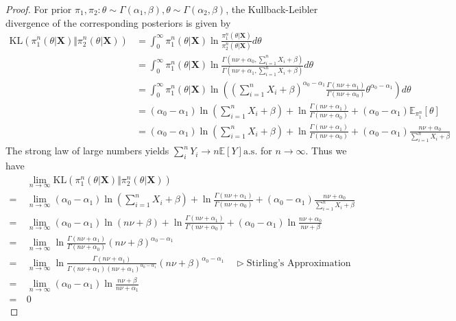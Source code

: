 \begin{proof}
For prior $\pi_1, \pi_2: \theta \sim \Gamma(\alpha_1, \beta), \theta \sim \Gamma(\alpha_2, \beta)$, the Kullback-Leibler divergence of the corresponding posteriors is given by
\begin{align*}
    \mathrm{KL}\left( \pi_1^{n}(\theta \vert \bm{X}) \Vert \pi_2^{n}(\theta \vert \bm{X})\right)
    &= \int_{0}^{\infty} \pi_1^{n}(\theta \vert \bm{X}) \ln \frac{\pi_1^{n}(\theta \vert \bm{X})}{\pi_2^{n}(\theta \vert \bm{X})} d\theta \\
    &= \int_{0}^{\infty} \pi_1^{n}(\theta \vert \bm{X}) \ln \frac
        {\Gamma(n\nu+\alpha_0, \sum_{i=1}^{n} X_i + \beta)}
        {\Gamma(n\nu+\alpha_1, \sum_{i=1}^{n} X_i + \beta)} d\theta \\
    &=\int_{0}^{\infty} \pi_1^{n}(\theta \vert \bm{X}) \ln \left(
        (\sum_{i=1}^{n}X_i + \beta)^{\alpha_0 - \alpha_1}
        \frac{\Gamma(n\nu+\alpha_1)}{\Gamma(n\nu+\alpha_0)}
        \theta^{\alpha_0 - \alpha_1}
        \right) d\theta\\
    &= (\alpha_0 - \alpha_1)\ln (\sum_{i=1}^{n}X_i + \beta) +
        \ln \frac{\Gamma(n\nu+\alpha_1)}{\Gamma(n\nu+\alpha_0)} +
        (\alpha_0 - \alpha_1) \mathbb{E}_{\pi^n_1} [\theta]\\
    &= (\alpha_0 - \alpha_1)\ln (\sum_{i=1}^{n}X_i + \beta) +
        \ln \frac{\Gamma(n\nu+\alpha_1)}{\Gamma(n\nu+\alpha_0)} +
        (\alpha_0 - \alpha_1) \frac{n\nu + \alpha_0}{\sum_{i=1}^{n}X_i + \beta}
\end{align*}
The strong law of large numbers yields $\sum_{i}^{n}Y_i \rightarrow n\mathbb{E} [Y] \mathrm{a.s.}$ for $n\rightarrow \infty$. Thus we have
\begin{align*}
    &\lim_{n\rightarrow\infty} \mathrm{KL}\left( \pi_1^{n}(\theta \vert \bm{X}) \Vert \pi_2^{n}(\theta \vert \bm{X})\right)\\
=\ & \lim_{n\rightarrow\infty} (\alpha_0 - \alpha_1)\ln (\sum_{i=1}^{n}X_i + \beta) +
        \ln \frac{\Gamma(n\nu+\alpha_1)}{\Gamma(n\nu+\alpha_0)} +
        (\alpha_0 - \alpha_1) \frac{n\nu + \alpha_0}{\sum_{i=1}^{n}X_i + \beta}\\
=\ & \lim_{n\rightarrow\infty} (\alpha_0 - \alpha_1) \ln(n\nu + \beta) + 
    \ln \frac{\Gamma(n\nu+\alpha_1)}{\Gamma(n\nu+\alpha_0)} + (\alpha_0 - \alpha_1) \ln \frac{n\nu+\alpha_0}{n\nu+\beta}\\
=\ & \lim_{n\rightarrow\infty} \ln \frac{\Gamma(n\nu+\alpha_1)}{\Gamma(n\nu+\alpha_0)} (n\nu + \beta)^{\alpha_0 - \alpha_1}\\
=\ & \lim_{n\rightarrow\infty} \ln \frac{\Gamma(n\nu+\alpha_1)}{\Gamma(n\nu+\alpha_1)(n\nu+\alpha_1)^{\alpha_0 - \alpha_1}} (n\nu + \beta)^{\alpha_0 - \alpha_1} \quad  \vartriangleright \text{Stirling's Approximation}\\
=\ & \lim_{n\rightarrow\infty} (\alpha_0 - \alpha_1) \ln \frac{n\nu+\beta}{n\nu+\alpha_1}\\
=\ &0
\end{align*}


\end{proof}
